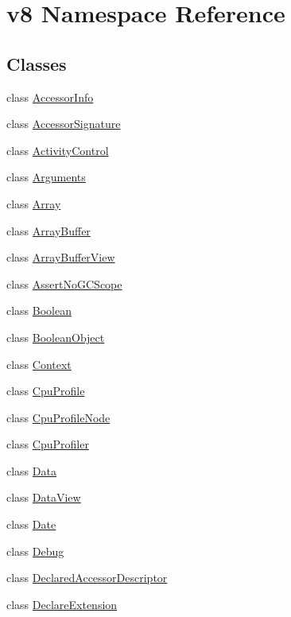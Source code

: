 \hypertarget{namespacev8}{}\section{v8 Namespace Reference}
\label{namespacev8}
\subsection*{Classes}
\begin{DoxyCompactItemize}
\item 
class \hyperlink{classv8_1_1_accessor_info}{Accessor\+Info}
\item 
class \hyperlink{classv8_1_1_accessor_signature}{Accessor\+Signature}
\item 
class \hyperlink{classv8_1_1_activity_control}{Activity\+Control}
\item 
class \hyperlink{classv8_1_1_arguments}{Arguments}
\item 
class \hyperlink{classv8_1_1_array}{Array}
\item 
class \hyperlink{classv8_1_1_array_buffer}{Array\+Buffer}
\item 
class \hyperlink{classv8_1_1_array_buffer_view}{Array\+Buffer\+View}
\item 
class \hyperlink{classv8_1_1_assert_no_g_c_scope}{Assert\+No\+G\+C\+Scope}
\item 
class \hyperlink{classv8_1_1_boolean}{Boolean}
\item 
class \hyperlink{classv8_1_1_boolean_object}{Boolean\+Object}
\item 
class \hyperlink{classv8_1_1_context}{Context}
\item 
class \hyperlink{classv8_1_1_cpu_profile}{Cpu\+Profile}
\item 
class \hyperlink{classv8_1_1_cpu_profile_node}{Cpu\+Profile\+Node}
\item 
class \hyperlink{classv8_1_1_cpu_profiler}{Cpu\+Profiler}
\item 
class \hyperlink{classv8_1_1_data}{Data}
\item 
class \hyperlink{classv8_1_1_data_view}{Data\+View}
\item 
class \hyperlink{classv8_1_1_date}{Date}
\item 
class \hyperlink{classv8_1_1_debug}{Debug}
\item 
class \hyperlink{classv8_1_1_declared_accessor_descriptor}{Declared\+Accessor\+Descriptor}
\item 
class \hyperlink{classv8_1_1_declare_extension}{Declare\+Extension}

\end{DoxyCompactItemize}
